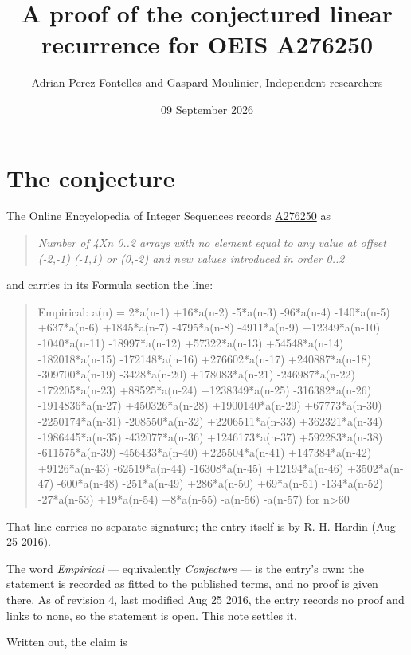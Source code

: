 \documentclass[11pt]{article}
\title{A proof of the conjectured linear recurrence for OEIS A276250}
\author{Adrian Perez Fontelles and Gaspard Moulinier, Independent researchers}
\date{09 September 2026}
\theoremstyle{definition}
\begin{document}
\maketitle
\section{The conjecture}

The Online Encyclopedia of Integer Sequences records \href{https://oeis.org/A276250}{A276250} as

\begin{quote}\itshape Number of 4Xn 0..2 arrays with no element equal to any value at offset (-2,-1) (-1,1) or (0,-2) and new values introduced in order 0..2\end{quote}

and carries in its Formula section the line:

\begin{quote}\ttfamily Empirical: a(n) = 2*a(n-1) +16*a(n-2) -5*a(n-3) -96*a(n-4) -140*a(n-5) +637*a(n-6) +1845*a(n-7) -4795*a(n-8) -4911*a(n-9) +12349*a(n-10) -1040*a(n-11) -18997*a(n-12) +57322*a(n-13) +54548*a(n-14) -182018*a(n-15) -172148*a(n-16) +276602*a(n-17) +240887*a(n-18) -309700*a(n-19) -3428*a(n-20) +178083*a(n-21) -246987*a(n-22) -172205*a(n-23) +88525*a(n-24) +1238349*a(n-25) -316382*a(n-26) -1914836*a(n-27) +450326*a(n-28) +1900140*a(n-29) +67773*a(n-30) -2250174*a(n-31) -208550*a(n-32) +2206511*a(n-33) +362321*a(n-34) -1986445*a(n-35) -432077*a(n-36) +1246173*a(n-37) +592283*a(n-38) -611575*a(n-39) -456433*a(n-40) +225504*a(n-41) +147384*a(n-42) +9126*a(n-43) -62519*a(n-44) -16308*a(n-45) +12194*a(n-46) +3502*a(n-47) -600*a(n-48) -251*a(n-49) +286*a(n-50) +69*a(n-51) -134*a(n-52) -27*a(n-53) +19*a(n-54) +8*a(n-55) -a(n-56) -a(n-57) for n>60\end{quote}

That line carries no separate signature; the entry itself is by R. H. Hardin (Aug 25 2016).

The word {\itshape Empirical} --- equivalently {\itshape Conjecture} --- is the entry's own: the statement is recorded as fitted to the published terms, and no proof is given there. As of revision 4, last modified Aug 25 2016, the entry records no proof and links to none, so the statement is open. This note settles it.

Written out, the claim is
\end{document}
